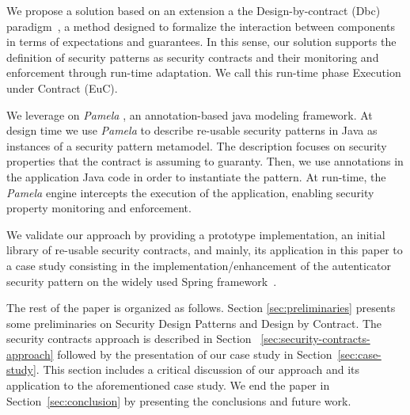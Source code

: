We propose a solution based on an extension a the Design-by-contract (Dbc) paradigm~\cite{meyer1992applying}, a method designed to formalize the interaction between components in terms of expectations and guarantees. In this sense, our solution supports the definition of security patterns as security contracts and their monitoring and enforcement through run-time adaptation. We call this run-time phase Execution under Contract (EuC). 


We leverage on \emph{Pamela} \cite{guerin:hal-03217126}, an annotation-based java modeling framework. At design time we use \emph{Pamela} to describe re-usable security patterns in Java as instances of a security pattern metamodel. The description focuses on security properties that the contract is assuming to guaranty. Then, we use annotations in the application Java code in order to instantiate the pattern. At run-time, the \emph{Pamela} engine intercepts the execution of the application, enabling security property monitoring and enforcement.

We validate our approach by providing a prototype implementation, an initial library of re-usable security contracts, and mainly, its application in this paper to a case study consisting in the implementation/enhancement of the autenticator security pattern on the widely used Spring framework~\cite{johnson2004spring}.

The rest of the paper is organized as follows. Section \ref{sec:preliminaries} presents some preliminaries on Security Design Patterns and Design by Contract. The security contracts approach is described in Section ~\ref{sec:security-contracts-approach} followed by the presentation of our case study in Section~\ref{sec:case-study}. This section includes a critical discussion of our approach and its application to the aforementioned case study. We end the paper in Section~\ref{sec:conclusion} by presenting the conclusions and future work.




